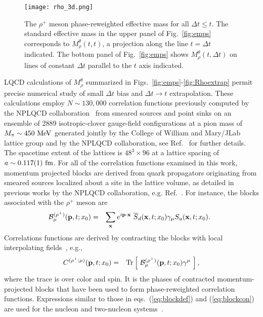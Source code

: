 %
\begin{figure}[!t]
  \centering
	\texttt{[image: rho\_3d.png]}
		\caption{
	\label{fig:2DEMP} 
        The $\rho^+$ meson phase-reweighted effective mass for all $\Delta t \leq t$. 
        The standard effective mass in the upper panel of Fig.~\ref{fig:emps} corresponds to
        $M^\theta_\rho(t,t)$, a projection along the line $t = \Delta t$ indicated.
        The bottom panel of Fig.~\ref{fig:emps} 
        shows $M^\theta_\rho(t,\Delta t)$ on lines of constant $\Delta t$ parallel to the $t$ axis indicated. 
	}		
\end{figure}
%

LQCD calculations of $M_\rho^\theta$ summarized in Figs.~\ref{fig:emps}-\ref{fig:Rhoextrap}
permit precise numerical study of small $\Delta t$ bias and $\Delta t \rightarrow t$ extrapolation.
These calculations employ $N\sim 130,000$ correlation functions
previously computed by the NPLQCD collaboration~ 
from smeared sources and point sinks on an 
ensemble of 2889 isotropic-clover gauge-field configurations 
at a pion mass of $M_\pi \sim 450~{\rm MeV}$
generated jointly by the College of William and Mary/JLab lattice group and by the NPLQCD collaboration, see Ref.~\cite{Orginos:2015aya} for further details.
The spacetime extent of the lattices is $48^3\times 96$ at a lattice spacing of $a\sim 0.117(1)~{\rm fm}$.
For all of the correlation functions examined in this work,  
momentum projected blocks are derived from quark propagators originating from smeared sources localized about a site in the lattice volume, 
as detailed in previous works by the NPLQCD collaboration, e.g. Ref.~\cite{Beane:2006mx,Orginos:2015aya}.
For instance, the blocks associated with the $\rho^+$ meson are
%
\begin{eqnarray}
{\cal B}^{(\rho^+)}_\mu ({\bf p},t; x_0) &  = & 
\sum_{\bf x} e^{i{\bf p}\cdot {\bf x}}\ \overline{S}_d({\bf x},t;x_0)\gamma_\mu S_u({\bf x},t;x_0).\;\;
  \label{eq:blockdef}
\end{eqnarray}
%
Correlations functions are derived by contracting the blocks with local interpolating fields~\cite{Detmold:2012eu},
e.g., 
%
\begin{eqnarray}
C^{(\rho^+;\mu)}({\bf p},t; x_0) & = & 
{\rm Tr}\left[\ 
{\cal B}^{(\rho^+)}_\mu ({\bf p},t; x_0)  \gamma^\mu
\ \right]
 ,
 \label{eq:blockcon}
\end{eqnarray}
%
where the trace is over color and spin. It is the phases of contracted momentum-projected blocks that have been used to form phase-reweighted correlation functions.
Expressions similar to those in eqs.~(\ref{eq:blockdef}) and (\ref{eq:blockcon}) are used for the nucleon and two-nucleon 
systems~\cite{Beane:2006mx,Orginos:2015aya}.



